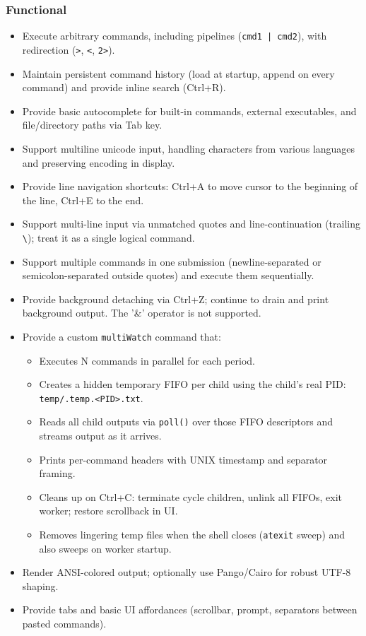 \documentclass[11pt,a4paper]{article}
\begin{document}
\subsubsection{Functional}
\begin{itemize}[leftmargin=*]
  \item Execute arbitrary commands, including pipelines (\verb!cmd1 | cmd2!), with redirection (\verb!>!, \verb!<!, \verb!2>!).
  \item Maintain persistent command history (load at startup, append on every command) and provide inline search (Ctrl+R).
  \item Provide basic autocomplete for built-in commands, external executables, and file/directory paths via Tab key.
  \item Support multiline unicode input, handling characters from various languages and preserving encoding in display.
  \item Provide line navigation shortcuts: Ctrl+A to move cursor to the beginning of the line, Ctrl+E to the end.
  \item Support multi-line input via unmatched quotes and line-continuation (trailing \verb!\!); treat it as a single logical command.
  \item Support multiple commands in one submission (newline-separated or semicolon-separated outside quotes) and execute them sequentially.
  \item Provide background detaching via Ctrl+Z; continue to drain and print background output. The '\&' operator is not supported.
  \item Provide a custom \texttt{multiWatch} command that:
    \begin{itemize}
      \item Executes N commands in parallel for each period.
      \item Creates a hidden temporary FIFO per child using the child's real PID: \verb!temp/.temp.<PID>.txt!.
      \item Reads all child outputs via \texttt{poll()} over those FIFO descriptors and streams output as it arrives.
      \item Prints per-command headers with UNIX timestamp and separator framing.
      \item Cleans up on Ctrl+C: terminate cycle children, unlink all FIFOs, exit worker; restore scrollback in UI.
      \item Removes lingering temp files when the shell closes (\texttt{atexit} sweep) and also sweeps on worker startup.
    \end{itemize}
  \item Render ANSI-colored output; optionally use Pango/Cairo for robust UTF-8 shaping.
  \item Provide tabs and basic UI affordances (scrollbar, prompt, separators between pasted commands).
\end{itemize}
\end{document}

